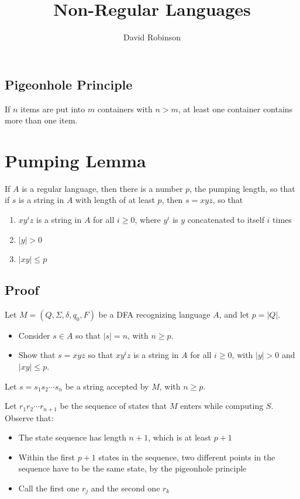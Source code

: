 \documentclass{article}
\title{Non-Regular Languages}
\author{David Robinson}
\date{}
\begin{document}
\maketitle


\subsection*{Pigeonhole Principle}

If $n$ items are put into $m$ containers with $n>m$, at least one container contains more than one item.

\section*{Pumping Lemma}

If $A$ is a regular language, then there is a number $p$, the pumping length, so that if $s$ is a string in $A$ with length of at least $p$, then $s=xyz$, so that
\begin{enumerate}
    \item $xy^i z$ is a string in $A$ for all $i\geq 0$, where $y^i$ is $y$ concatenated to itself $i$ times
    \item $|y| > 0$
    \item $|xy| \leq p$
\end{enumerate}

\subsection*{Proof}

Let $M=(Q, \Sigma, \delta, q_0, F)$ be a DFA recognizing language $A$, and let $p=|Q|$.
\begin{itemize}
    \item Consider $s\in A$ so that $|s|=n$, with $n\geq p$.
    \item Show that $s=xyz$ so that $xy^i z$ is a string in $A$ for all $i\geq 0$, with $|y|>0$ and $|xy|\leq p$.
\end{itemize}

Let $s=s_1 s_2\cdots s_n$ be a string accepted by $M$, with $n\geq p$.
\vspace{1em}

Let $r_1 r_2 \cdots r_{n+1}$ be the sequence of states that $M$ enters while computing $S$. Observe that:
\begin{itemize}
    \item The state sequence has length $n+1$, which is at least $p+1$
    \item Within the first $p+1$ states in the sequence, two different points in the sequence have to be the same state, by the pigeonhole principle
    \item Call the first one $r_j$ and the second one $r_k$
\end{itemize}
\end{document}
